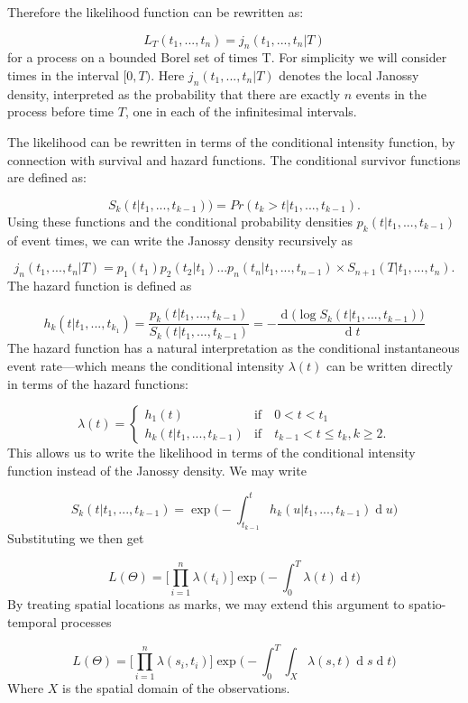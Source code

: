 \documentclass[11pt,a4paper]{article}
\renewcommand{\d}[1]{\ensuremath{\operatorname{d}\!{#1}}}
\begin{document}
Therefore the likelihood function can be rewritten as:

\[
L_{T}(t_{1}, ... , t_{n}) = j_{n}(t_{1}, ... ,t_{n} | T)
\]
for a process on a bounded Borel set of times T. For simplicity we will consider times in the interval $[0, T)$. Here $ j_{n}(t_{1}, ... ,t_{n} | T)$ denotes the local Janossy density, interpreted as the probability that there are exactly $n$ events in the process before time $T$, one in each of the infinitesimal intervals.

The likelihood can be rewritten in terms of the conditional intensity function, by connection with survival and hazard functions. 
The conditional survivor functions are defined as:

\[
S_{k}(t | t_{1}, ... , t_{k - 1})) = Pr(t_{k} > t | t_{1}, ... , t_{k - 1}). 
\]
Using these functions and the conditional probability densities $p_{k}(t | t_{1}, ... , t_{k-1})$ of event times, we can write the Janossy density recursively as

\[
j_{n}(t_{1}, ... ,t_{n} | T) = p_{1}(t_{1})p_{2}(t_{2} | t_{1}) ...p_{n}(t_{n} | t_{1}, ..., t_{n - 1}) \times S_{n+1} (T | t_{1}, ... ,t_{n}).
\]
The hazard function is defined as

\[
h_{k}(t | t_{1}, ... , t_{k_{1}}) = \frac{p_{k}(t | t_{1}, ... , t_{k - 1})}{S_{k}(t | t_{1}, ... , t_{k - 1})} = - \frac{\d ( \log S_{k}(t | t_{1}, ... , t_{k - 1}))}{\d t}
\]
The hazard function has a natural interpretation as the conditional instantaneous event rate—which means the conditional intensity $\lambda (t)$ can be written directly in terms of the hazard functions:

\[
\lambda (t) =
\begin{cases}
h_{1}(t) & \mbox{if} \quad 0 < t < t_{1} \\
h_{k}(t | t_{1}, ..., t_{k-1}) & \mbox{if} \quad t_{k - 1} < t \leq t_{k}, k \geq 2.
\end{cases}
\]
This allows us to write the likelihood in terms of the conditional intensity function instead of the Janossy density. We may write

\[
S_{k}(t | t_{1}, ... , t_{k - 1}) = \exp \Bigg( - \int_{t_{k-1}}^{t} h_{k} (u | t_{1}, ..., t_{k-1}) \d u \Bigg)
\]
Substituting we then get

\[
L(\Theta) = \Bigg[ \prod_{i=1}^{n} \lambda(t_{i}) \Bigg] \exp \Bigg( - \int_{0}^T \lambda(t) \d t  \Bigg)
\]
By treating spatial locations as marks, we may extend this argument to spatio-temporal processes

\[
L(\Theta) = \Bigg[ \prod_{i=1}^{n} \lambda(s_{i}, t_{i}) \Bigg] \exp \Bigg( - \int_{0}^{T} \int_{X} \lambda(s, t) \d s \d t  \Bigg)
\]
Where $X$ is the spatial domain of the observations.
\end{document}
